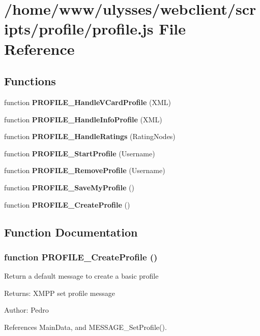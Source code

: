 \section{/home/www/ulysses/webclient/scripts/profile/profile.js File Reference}
\label{profile_2profile_8js}
\subsection*{Functions}
\begin{CompactItemize}
\item 
function {\bf PROFILE\_\-HandleVCardProfile} (XML)
\item 
function {\bf PROFILE\_\-HandleInfoProfile} (XML)
\item 
function {\bf PROFILE\_\-HandleRatings} (RatingNodes)
\item 
function {\bf PROFILE\_\-StartProfile} (Username)
\item 
function {\bf PROFILE\_\-RemoveProfile} (Username)
\item 
function {\bf PROFILE\_\-SaveMyProfile} ()
\item 
function {\bf PROFILE\_\-CreateProfile} ()
\end{CompactItemize}


\subsection{Function Documentation}
\subsubsection{\setlength{\rightskip}{0pt plus 5cm}function PROFILE\_\-CreateProfile ()}\label{profile_2profile_8js_ac998595adfe76da94a965aee7b76503}


Return a default message to create a basic profile \begin{Desc}
\item[Returns:]XMPP set profile message \end{Desc}
\begin{Desc}
\item[Author:]Pedro \end{Desc}


References MainData, and MESSAGE\_\-SetProfile().

